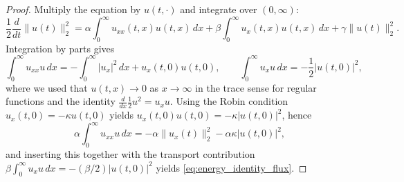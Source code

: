 \documentclass[10pt,a4paper]{amsart}
\begin{document}
\begin{proof}
Multiply the equation by $u(t,\cdot)$ and integrate over $(0,\infty)$:
\[
\frac{1}{2}\frac{d}{dt}\|u(t)\|_2^2
=
\alpha\int_0^\infty u_{xx}(t,x)u(t,x)\,dx
+\beta\int_0^\infty u_x(t,x)u(t,x)\,dx
+\gamma\|u(t)\|_2^2.
\]
Integration by parts gives
\[
\int_0^\infty u_{xx}u\,dx
=
-\int_0^\infty |u_x|^2\,dx+u_x(t,0)u(t,0),
\qquad
\int_0^\infty u_xu\,dx
=
-\frac{1}{2}|u(t,0)|^2,
\]
where we used that $u(t,x)\to0$ as $x\to\infty$ in the trace sense for regular functions and the identity $\frac{d}{dx}\frac{1}{2}u^2=u_xu$. Using the Robin condition $u_x(t,0)=-\kappa u(t,0)$ yields
$u_x(t,0)u(t,0)=-\kappa |u(t,0)|^2$, hence
\[
\alpha\int_0^\infty u_{xx}u\,dx
=
-\alpha\|u_x(t)\|_2^2-\alpha\kappa|u(t,0)|^2,
\]
and inserting this together with the transport contribution
$\beta\int_0^\infty u_xu\,dx=-(\beta/2)|u(t,0)|^2$ yields \eqref{eq:energy_identity_flux}.
\end{proof}
\end{document}
